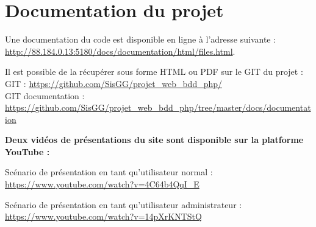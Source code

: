             
\section{Documentation du projet}

    \begin{paragraphe}
        Une documentation du code est disponible en ligne à l'adresse suivante : \\
        \href{http://88.184.0.13:5180/docs/documentation/html/files.html}{http://88.184.0.13:5180/docs/documentation/html/files.html}{}.
    \end{paragraphe}
        
    \begin{paragraphe}
        Il est possible de la récupérer sous forme HTML ou PDF sur le GIT du projet : \\
        GIT : \href{https://github.com/SisGG/projet\_web\_bdd\_php/}{https://github.com/SisGG/projet\_web\_bdd\_php/} \\
        GIT documentation : \href{https://github.com/SisGG/projet\_web\_bdd\_php/tree/master/docs/documentation}{https://github.com/SisGG/projet\_web\_bdd\_php/tree/master/docs/documentation}
    \end{paragraphe}
    
    \vspace{2em}
    
    \begin{paragraphe}
        \textbf{Deux vidéos de présentations du site sont disponible sur la platforme YouTube :}
    \end{paragraphe}
    
    \begin{paragraphe}
        Scénario de présentation en tant qu'utilisateur normal : \\
        \href{https://www.youtube.com/watch?v=4C64b4QqI\_E}{https://www.youtube.com/watch?v=4C64b4QqI\_E}
    \end{paragraphe}
    
    \begin{paragraphe}
        Scénario de présentation en tant qu'utilisateur administrateur : \\
        \href{https://www.youtube.com/watch?v=14pXrKNTStQ}{https://www.youtube.com/watch?v=14pXrKNTStQ}
    \end{paragraphe}
        